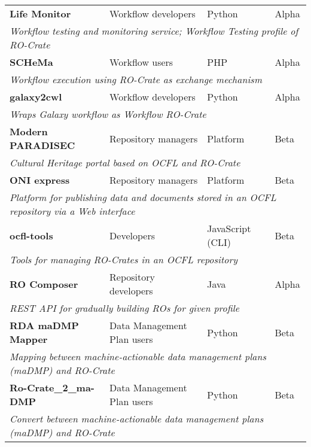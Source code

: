 \begin{table}[htbp]
\begin{tabular}{llll}
		\textbf{Life Monitor} \citep{about-lifemonitor} & Workflow developers & Python & Alpha \\
		\multicolumn{4}{l}{\it Workflow testing and monitoring service; Workflow Testing profile of RO-Crate} \\
		
        \textbf{SCHeMa} \citep{vergoulis2021schema} & Workflow users & PHP & Alpha \\
        \multicolumn{4}{l}{\it Workflow execution using RO-Crate as exchange mechanism} \\

		\textbf{galaxy2cwl} \citep{galaxy2cwl} & Workflow developers & Python & Alpha \\
		\multicolumn{4}{l}{\it Wraps Galaxy workflow as Workflow RO-Crate} \\

		\textbf{Modern PARADISEC} \citep{modpdsc} & Repository managers & Platform & Beta \\
		\multicolumn{4}{l}{\it Cultural Heritage portal based on OCFL and RO-Crate} \\
		
		\textbf{ONI express} \citep{arkisto-data-portal} & Repository managers & Platform & Beta \\
		\multicolumn{4}{l}{\it Platform for publishing data and documents stored in an OCFL repository via a Web interface} \\
		
		\textbf{ocfl-tools} \citep{ocfl-tools} & Developers & JavaScript (CLI) & Beta \\
		\multicolumn{4}{l}{\it Tools for managing RO-Crates in an OCFL repository}\\
		
		\textbf{RO Composer} \citep{ro-composer} & Repository developers & Java & Alpha \\ 
		\multicolumn{4}{l}{\it REST API for gradually building ROs for given profile} \\
		
		\textbf{RDA maDMP Mapper} \citep{doi:10.5281/zenodo.3922136} & Data Management Plan users & Python & Beta \\
		\multicolumn{4}{l}{\it Mapping between machine-actionable data management plans (maDMP) and RO-Crate \citep{doi:10.4126/frl01-006423291} } \\

        \textbf{Ro-Crate\_2\_ma-DMP} \citep{doi:10.5281/zenodo.3903463} & Data Management Plan users & Python & Beta \\
        \multicolumn{4}{l}{\it Convert between machine-actionable data management plans (maDMP) and RO-Crate } \\
        

\end{tabular}
\end{table}
